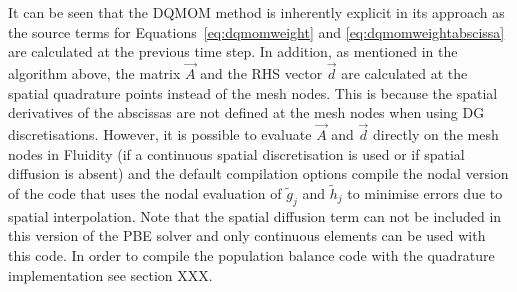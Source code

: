 It can be seen that the DQMOM method is inherently explicit in its approach as the source terms for Equations~\eqref{eq:dqmomweight} and \eqref{eq:dqmomweightabscissa} are calculated at the previous time step. 
In addition, as mentioned in the algorithm above, the matrix $\vec{A}$ and the RHS vector $\vec{d}$ are calculated at the spatial quadrature points instead of the mesh nodes. This is because the spatial derivatives of the abscissas are not defined at the mesh nodes when using DG discretisations.
However, it is possible to evaluate $\vec{A}$ and $\vec{d}$ directly on the mesh nodes in Fluidity (if a continuous spatial discretisation is used or if spatial diffusion is absent) and the default compilation options compile the nodal version of the code that uses the nodal evaluation of $\widetilde{g}_j$ and $\widetilde{h}_j$ to minimise errors due to spatial interpolation.
Note that the spatial diffusion term can not be included in this version of the PBE solver and only continuous elements can be used with this code. In order to compile the population balance code with the quadrature implementation see section XXX.